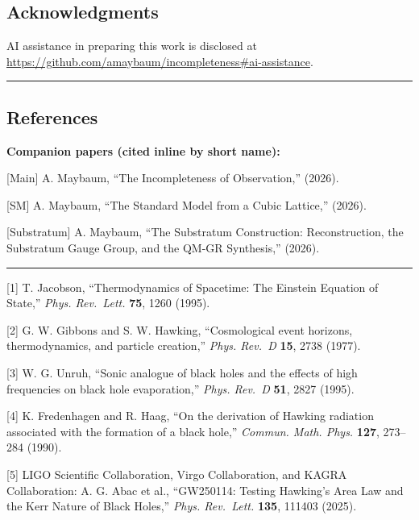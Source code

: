 \documentclass[
]{article}
\begin{document}
\hypertarget{acknowledgments}{%
\subsection{Acknowledgments}\label{acknowledgments}}

AI assistance in preparing this work is disclosed at\\
\url{https://github.com/amaybaum/incompleteness\#ai-assistance}.

\begin{center}\rule{0.5\linewidth}{0.5pt}\end{center}

\hypertarget{references}{%
\subsection{References}\label{references}}

\textbf{Companion papers (cited inline by short name):}

{[}Main{]} A. Maybaum, ``The Incompleteness of Observation,'' (2026).

{[}SM{]} A. Maybaum, ``The Standard Model from a Cubic Lattice,''
(2026).

{[}Substratum{]} A. Maybaum, ``The Substratum Construction:
Reconstruction, the Substratum Gauge Group, and the QM-GR Synthesis,''
(2026).

\begin{center}\rule{0.5\linewidth}{0.5pt}\end{center}

{[}1{]} T. Jacobson, ``Thermodynamics of Spacetime: The Einstein
Equation of State,'' \emph{Phys. Rev.~Lett.} \textbf{75}, 1260 (1995).

{[}2{]} G. W. Gibbons and S. W. Hawking, ``Cosmological event horizons,
thermodynamics, and particle creation,'' \emph{Phys. Rev.~D}
\textbf{15}, 2738 (1977).

{[}3{]} W. G. Unruh, ``Sonic analogue of black holes and the effects of
high frequencies on black hole evaporation,'' \emph{Phys. Rev.~D}
\textbf{51}, 2827 (1995).

{[}4{]} K. Fredenhagen and R. Haag, ``On the derivation of Hawking
radiation associated with the formation of a black hole,'' \emph{Commun.
Math. Phys.} \textbf{127}, 273--284 (1990).

{[}5{]} LIGO Scientific Collaboration, Virgo Collaboration, and KAGRA
Collaboration: A. G. Abac et al., ``GW250114: Testing Hawking's Area Law
and the Kerr Nature of Black Holes,'' \emph{Phys. Rev.~Lett.}
\textbf{135}, 111403 (2025).
\end{document}
